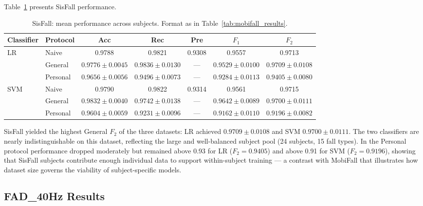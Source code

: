 \documentclass[onluarkali,ingilizce,yukseklisans,karton,LisansustuEgitim]{itutez}
\providecommand{\1}{\mathbf{1}}
\begin{document}
Table~\ref{tab:sisfall_results} presents SisFall performance.

\begin{table}[h!]
\centering
\caption{SisFall: mean performance across subjects.  Format as in
  Table~\ref{tab:mobifall_results}.}
\label{tab:sisfall_results}
\setlength{\tabcolsep}{3pt}\footnotesize
\begin{tabular}{llccccc}
\toprule
\textbf{Classifier} & \textbf{Protocol}
  & \textbf{Acc} & \textbf{Rec} & \textbf{Pre}
  & \textbf{$F_1$} & \textbf{$F_2$} \\
\midrule
\multirow{3}{*}{LR}
 & Naive
   & 0.9788 & 0.9821 & 0.9308 & 0.9557 & 0.9713 \\
 & General
   & $0.9776 \pm 0.0045$ & $0.9836 \pm 0.0130$ & ---
   & $0.9529 \pm 0.0100$ & $0.9709 \pm 0.0108$ \\
 & Personal
   & $0.9656 \pm 0.0056$ & $0.9496 \pm 0.0073$ & ---
   & $0.9284 \pm 0.0113$ & $0.9405 \pm 0.0080$ \\
\midrule
\multirow{3}{*}{SVM}
 & Naive
   & 0.9790 & 0.9822 & 0.9314 & 0.9561 & 0.9715 \\
 & General
   & $0.9832 \pm 0.0040$ & $0.9742 \pm 0.0138$ & ---
   & $0.9642 \pm 0.0089$ & $0.9700 \pm 0.0111$ \\
 & Personal
   & $0.9604 \pm 0.0059$ & $0.9231 \pm 0.0096$ & ---
   & $0.9162 \pm 0.0110$ & $0.9196 \pm 0.0082$ \\
\bottomrule
\end{tabular}
\end{table}

SisFall yielded the highest General $F_2$ of the three datasets: LR achieved $0.9709 \pm 0.0108$ and SVM $0.9700 \pm 0.0111$. The two classifiers are nearly indistinguishable on this dataset, reflecting the large and well-balanced subject pool (24 subjects, 15 fall types). In the Personal protocol performance dropped moderately but remained above 0.93 for LR ($F_2 = 0.9405$) and above 0.91 for SVM ($F_2 = 0.9196$), showing that SisFall subjects contribute enough individual data to support within-subject training --- a contrast with MobiFall that illustrates how dataset size governs the viability of subject-specific models.


\subsection{FAD\_40Hz Results}
\label{subsubsec:fad_results}
\end{document}
